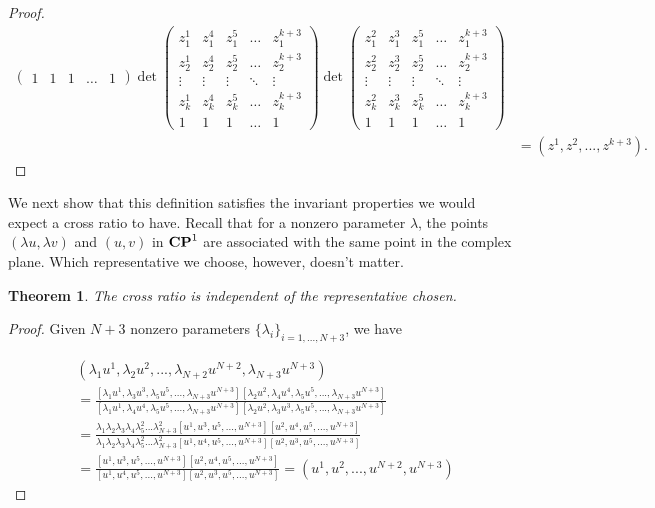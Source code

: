 \documentclass{amsart}
\theoremstyle{theorem}
\newtheorem{theorem}{Theorem}
\theoremstyle{lemma}
\theoremstyle{definition}
\begin{document}
\begin{proof}
\begin{align*}
{\begin{pmatrix}
    1 & 1 & 1 & \dots & 1
\end{pmatrix}}
{\det \begin{pmatrix}
    z_1^1 & z_1^4 & z_1^5 & \dots  & z_1^{k+3} \\
    z_2^1 & z_2^4 & z_2^5 & \dots  & z_2^{k+3} \\
    \vdots & \vdots & \vdots & \ddots & \vdots \\
    z_{k}^1 & z_{k}^4 & z_{k}^5 & \dots  &  z_{k}^{k+3} \\
    1 & 1 & 1 & \dots & 1
\end{pmatrix}\det \begin{pmatrix}
    z_1^2 & z_1^3 & z_1^5 & \dots  & z_1^{k+3} \\
    z_2^2 & z_2^3 & z_2^5 & \dots  & z_2^{k+3} \\
    \vdots & \vdots & \vdots & \ddots & \vdots \\
    z_{k}^2 & z_{k}^3 & z_{k}^5 & \dots  &  z_{k}^{k+3} \\
    1 & 1 & 1 & \dots & 1
\end{pmatrix}}\\
&=(z^1, z^2,..., z^{k+3}).
\end{align*}
\end{proof}

We next show that this definition satisfies the invariant properties we would expect a cross ratio to have. Recall that for a nonzero parameter $\lambda$, the points $(\lambda u, \lambda v)$ and $(u, v)$ in ${\bf CP}^1$ are associated with the same point in the complex plane. Which representative we choose, however, doesn't matter.

\begin{theorem}
The cross ratio is independent of the representative chosen.
\end{theorem}

\begin{proof}
Given $N+3$ nonzero parameters $\{\lambda_i\}_{i=1,...,N+3}$, we have

\begin{align*}
&(\lambda_1u^1, \lambda_2u^2, ...,\lambda_{N+2}u^{N+2}, \lambda_{N+3}u^{N+3})\\
&=\frac{[\lambda_1u^1, \lambda_3u^3,\lambda_5u^5,...,\lambda_{N+3}u^{N+3}][\lambda_2u^2,\lambda_4u^4,\lambda_5u^5,...,\lambda_{N+3}u^{N+3}]}{[\lambda_1u^1, \lambda_4u^4,\lambda_5u^5,...,\lambda_{N+3}u^{N+3}][\lambda_2u^2,\lambda_3u^3,\lambda_5u^5,...,\lambda_{N+3}u^{N+3}]}\\
&=\frac{\lambda_1\lambda_2\lambda_3\lambda_4\lambda_5^2...\lambda_{N+3}^2[u^1, u^3, u^5,..., u^{N+3}][u^2, u^4, u^5,..., u^{N+3}]}{\lambda_1\lambda_2\lambda_3\lambda_4\lambda_5^2...\lambda_{N+3}^2[u^1, u^4, u^5,..., u^{N+3}][u^2, u^3, u^5,..., u^{N+3}]}\\
&=\frac{[u^1, u^3, u^5,..., u^{N+3}][u^2, u^4, u^5,..., u^{N+3}]}{[u^1, u^4, u^5,..., u^{N+3}][u^2, u^3, u^5,..., u^{N+3}]}=(u^1, u^2, ..., u^{N+2}, u^{N+3})
\end{align*}
\end{proof}
\end{document}
